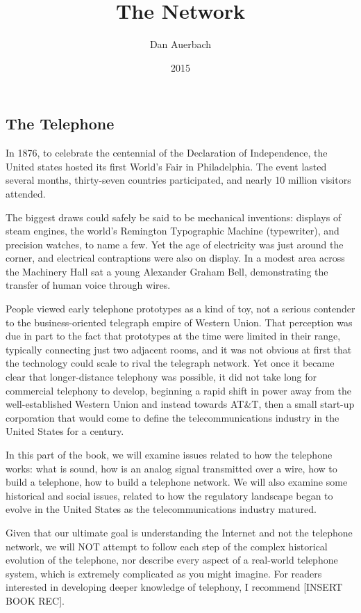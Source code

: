 \documentclass[UTF8]{book}
\begin{document}
\begin{CJK}{UTF8}{gbsn}

\title{The Network}
\author{Dan Auerbach}
\date{2015}
\maketitle

\part{The Telephone}

In 1876, to celebrate the centennial of the Declaration of Independence, the United states hosted its first World's Fair in Philadelphia. The event lasted several months, thirty-seven countries participated, and nearly 10 million visitors attended.

The biggest draws could safely be said to be mechanical inventions: displays of steam engines, the world's Remington Typographic Machine (typewriter), and precision watches, to name a few. Yet the age of electricity was just around the corner, and electrical contraptions were also on display. In a modest area across the Machinery Hall sat a young Alexander Graham Bell, demonstrating the transfer of human voice through wires.

People viewed early telephone prototypes as a kind of toy, not a serious contender to the business-oriented telegraph empire of Western Union. That perception was due in part to the fact that prototypes at the time were limited in their range, typically connecting just two adjacent rooms, and it was not obvious at first that the technology could scale to rival the telegraph network. Yet once it became clear that longer-distance telephony was possible, it did not take long for commercial telephony to develop, beginning a rapid shift in power away from the well-established Western Union and instead towards AT\&T, then a small start-up corporation that would come to define the telecommunications industry in the United States for a century.

In this part of the book, we will examine issues related to how the telephone works: what is sound, how is an analog signal transmitted over a wire, how to build a telephone, how to build a telephone network. We will also examine some historical and social issues, related to how the regulatory landscape began to evolve in the United States as the telecommunications industry matured.

Given that our ultimate goal is understanding the Internet and not the telephone network, we will NOT attempt to follow each step of the complex  historical evolution of the telephone, nor describe every aspect of a real-world telephone system, which is extremely complicated as you might imagine. For readers interested in developing deeper knowledge of telephony, I recommend [INSERT BOOK REC].


\end{CJK}
\end{document}
